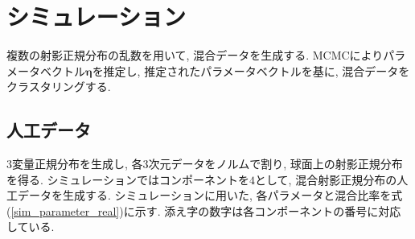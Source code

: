 \documentclass[a4j,12pt]{jarticle}
\begin{document}
\newpage
\section{シミュレーション}

複数の射影正規分布の乱数を用いて, 混合データを生成する. MCMCによりパラメータベクトル$\bm \eta$を推定し, 推定されたパラメータベクトルを基に, 混合データをクラスタリングする. 

\subsection{人工データ}

$3$変量正規分布を生成し, 各$3$次元データをノルムで割り, 球面上の射影正規分布を得る. シミュレーションではコンポーネントを$4$として, 混合射影正規分布の人工データを生成する. シミュレーションに用いた, 各パラメータと混合比率を式(\ref{sim_parameter_real})に示す. 添え字の数字は各コンポーネントの番号に対応している. 
\end{document}
